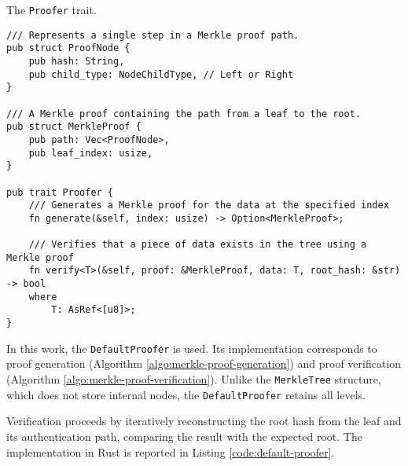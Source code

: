 \begin{listing}[!htb]
\caption{The \texttt{Proofer} trait.}
\label{code:mt-proofer-trait}
\begin{verbatim}
/// Represents a single step in a Merkle proof path.
pub struct ProofNode {
    pub hash: String,
    pub child_type: NodeChildType, // Left or Right
}

/// A Merkle proof containing the path from a leaf to the root.
pub struct MerkleProof {
    pub path: Vec<ProofNode>,
    pub leaf_index: usize,
}

pub trait Proofer {
    /// Generates a Merkle proof for the data at the specified index
    fn generate(&self, index: usize) -> Option<MerkleProof>;

    /// Verifies that a piece of data exists in the tree using a Merkle proof
    fn verify<T>(&self, proof: &MerkleProof, data: T, root_hash: &str) -> bool
    where
        T: AsRef<[u8]>;
}
\end{verbatim}
\end{listing}


In this work, the \texttt{DefaultProofer} is used. Its implementation corresponds to proof generation (Algorithm \ref{algo:merkle-proof-generation}) and proof verification (Algorithm \ref{algo:merkle-proof-verification}). Unlike the \texttt{MerkleTree} structure, which does not store internal nodes, the \texttt{DefaultProofer} retains all levels.


Verification proceeds by iteratively reconstructing the root hash from the leaf and its authentication path, comparing the result with the expected root. The implementation in Rust is reported in Listing \ref{code:default-proofer}.

